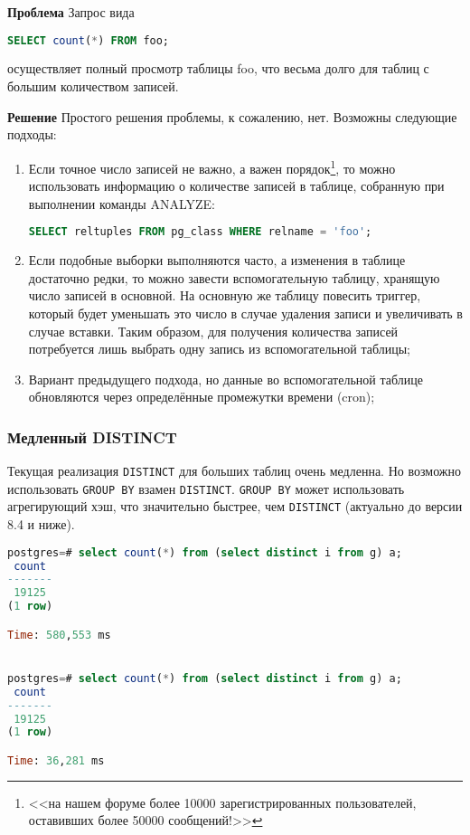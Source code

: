 \textbf{Проблема} Запрос вида

\begin{lstlisting}[language=SQL,label=lst:sql_performance1,caption=SQL]
SELECT count(*) FROM foo;
\end{lstlisting}

осуществляет полный просмотр таблицы foo, что весьма долго для таблиц с большим количеством записей.

\textbf{Решение} Простого решения проблемы, к сожалению, нет. Возможны следующие подходы:

\begin{enumerate}
  \item Если точное число записей не важно, а важен порядок\footnote{<<на нашем форуме более 10000 зарегистрированных пользователей, оставивших более 50000 сообщений!>>}, то можно использовать информацию о количестве записей в таблице, собранную при выполнении команды ANALYZE:
\begin{lstlisting}[language=SQL,label=lst:sql_performance2,caption=SQL]
SELECT reltuples FROM pg_class WHERE relname = 'foo';
\end{lstlisting}
  \item Если подобные выборки выполняются часто, а изменения в таблице достаточно редки, то можно завести вспомогательную таблицу, хранящую число записей в основной. На основную же таблицу повесить триггер, который будет уменьшать это число в случае удаления записи и увеличивать в случае вставки. Таким образом, для получения количества записей потребуется лишь выбрать одну запись из вспомогательной таблицы;
  \item Вариант предыдущего подхода, но данные во вспомогательной таблице обновляются через определённые промежутки времени (cron);
\end{enumerate}


\subsubsection{Медленный DISTINCT}

Текущая реализация \lstinline!DISTINCT! для больших таблиц очень медленна. Но возможно использовать \lstinline!GROUP BY! взамен \lstinline!DISTINCT!. \lstinline!GROUP BY! может использовать агрегирующий хэш, что значительно быстрее, чем \lstinline!DISTINCT! (актуально до версии 8.4 и ниже).

\begin{lstlisting}[language=SQL,label=lst:sql_performance3,caption=DISTINCT]
postgres=# select count(*) from (select distinct i from g) a;
 count
-------
 19125
(1 row)

Time: 580,553 ms


postgres=# select count(*) from (select distinct i from g) a;
 count
-------
 19125
(1 row)

Time: 36,281 ms
\end{lstlisting}

